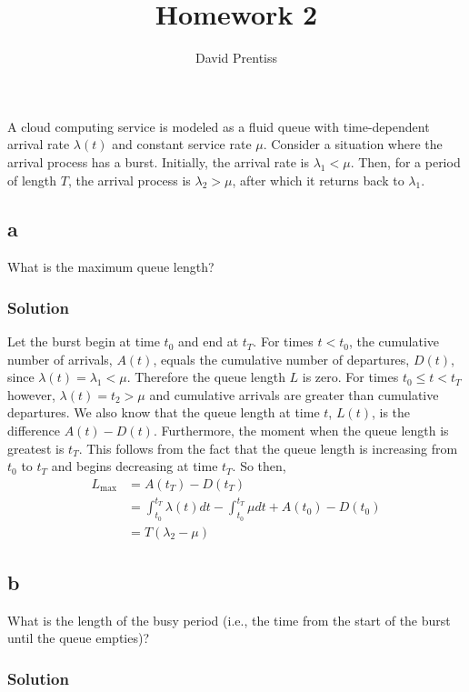 \documentclass{amsart}
\title{Homework 2}
\author{David Prentiss}
\begin{document}
\maketitle

\section{} %
A cloud computing service is modeled as a fluid queue with time-dependent
arrival rate $\lambda(t)$ and constant service rate $\mu$. Consider a situation where the
arrival process has a burst. Initially, the arrival rate is $\lambda_1<\mu$. Then, for a
period of length $T$, the arrival process is $\lambda_2>\mu$, after which it
returns back to $\lambda_1$.

\subsection*{a}
What is the maximum queue length?
\subsubsection*{Solution}
Let the burst begin at time $t_0$ and end at $t_T$. For times $t<t_0$, the
cumulative number of arrivals, $A(t)$, equals the cumulative number of
departures, $D(t)$, since $\lambda(t) = \lambda_1 < \mu$. Therefore the queue
length $L$ is zero. For times $t_0\leq t<t_T$ however, $\lambda(t) = t_2 > \mu$
and cumulative arrivals are greater than cumulative departures. We also know
that the queue length at time $t$, $L(t)$, is the difference $A(t)-D(t)$.
Furthermore, the moment when the queue length is greatest is $t_T$. This follows
from the fact that the queue length is increasing from $t_0$ to $t_T$ and begins
decreasing at time $t_T$. So then,
\begin{align}
  L_\text{max} &= A(t_T) - D(t_T) \\
  &= \int_{t_0}^{t_T}\lambda(t)dt - \int_{t_0}^{t_T}\mu dt + A(t_0)-D(t_0) \\
  &= T(\lambda_2 - \mu)
\end{align}

\subsection*{b}
What is the length of the busy period (i.e., the time from the start of the burst until the
queue empties)?

\subsubsection*{Solution}
\end{document}

